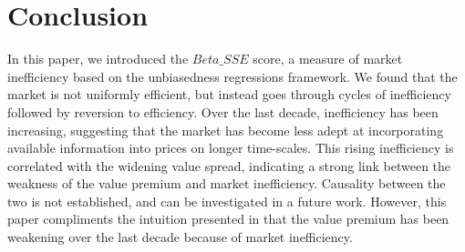 \section{Conclusion}
\label{sec:conclusion}

In this paper, we introduced the $Beta\_SSE$ score, a measure of market inefficiency based on the unbiasedness regressions framework.
We found that the market is not uniformly efficient, but instead goes through cycles of inefficiency followed by reversion to efficiency.
Over the last decade, inefficiency has been increasing, suggesting that the market has become less adept at incorporating available information into prices on longer time-scales.
This rising inefficiency is correlated with the widening value spread, indicating a strong link between the weakness of the value premium and market inefficiency.
Causality between the two is not established, and can be investigated in a future work. However, this paper compliments the intuition 
presented in \citet{asness_2024} that the value premium has been weakening over the last decade because of market inefficiency.
